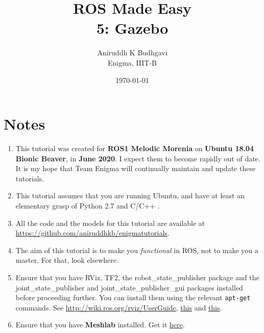 \documentclass{article}
\title{ROS Made Easy \\5: Gazebo}
\date{\today}
\author{Aniruddh K Budhgavi \\Enigma, IIIT-B}
\begin{document}
    \maketitle
    \section{Notes}
    \begin{enumerate}
        \item This tutorial was created for \textbf{ROS1 Melodic Morenia}
        on \textbf{Ubuntu 18.04 Bionic Beaver}, in \textbf{June 2020}.
        I expect them to become rapidly out of date. It is my hope
        that Team Enigma will continually maintain and update these tutorials.
        \item This tutorial assumes that you are running Ubuntu, and have at least an
        elementary grasp of Python 2.7 and C/C++ .
        \item All the code and the models for this tutorial are available at 
        \url{https://github.com/aniruddhkb/enigmatutorials}.
        \item The aim of this tutorial is to make you \emph{functional} in ROS, not to make you a master. For 
        that, look elsewhere.
        \item Ensure that you have RViz, TF2, the robot\_state\_publisher package and the joint\_state\_publisher
        and joint\_state\_publisher\_gui packages installed before proceeding further. You can install them 
        using the relevant \texttt{apt-get} commands. See \url{http://wiki.ros.org/rviz/UserGuide},
        \href{http://wiki.ros.org/tf2/Tutorials/Introduction%20to%20tf2}{this} and
        \href{https://answers.ros.org/question/346665/how-to-install-joint_state_publisher_gui-in-melodic-version-of-ros/}{this}.

        \item Ensure that you have \textbf{Meshlab} installed. Get it \href{https://snapcraft.io/install/meshlab/ubuntu}{here}.
    \end{enumerate}
\end{document}
